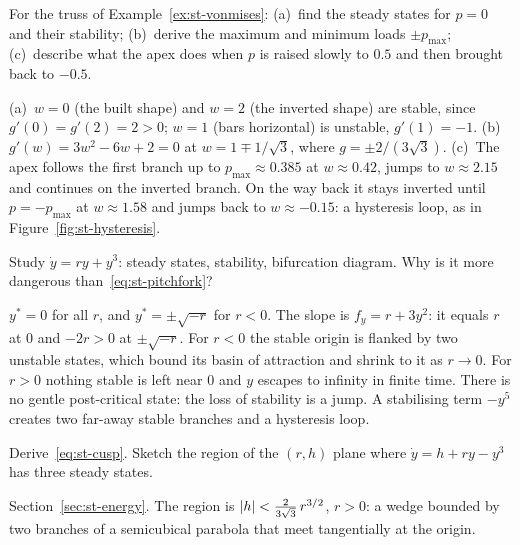 \label{exo:st-vonmises}
%
For the truss of Example~\ref{ex:st-vonmises}:
(a)~find the steady states for $p = 0$ and their stability;
(b)~derive the maximum and minimum loads $\pm p_{\max}$;
(c)~describe what the apex does when $p$ is raised slowly to $0.5$ and then
brought back to $-0.5$.
\begin{solution}
(a)~$w = 0$ (the built shape) and $w = 2$ (the inverted shape) are stable,
since $g'(0) = g'(2) = 2 > 0$; $w = 1$ (bars horizontal) is unstable, $g'(1) = -1$.
(b)~$g'(w) = 3w^2 - 6w + 2 = 0$ at $w = 1 \mp 1/\sqrt3$, where
$g = \pm 2/(3\sqrt3)$.
(c)~The apex follows the first branch up to $p_{\max} \approx 0.385$ at
$w \approx 0.42$, jumps to $w \approx 2.15$ and continues on the inverted branch.
On the way back it stays inverted until $p = -p_{\max}$ at $w \approx 1.58$ and
jumps back to $w \approx -0.15$: a hysteresis loop, as in
Figure~\ref{fig:st-hysteresis}.
\end{solution}

\label{exo:st-subcritical}
%
Study $\dot y = ry + y^3$: steady states, stability, bifurcation diagram. Why is
it more dangerous than~\eqref{eq:st-pitchfork}?
\begin{solution}
$y^* = 0$ for all $r$, and $y^* = \pm\sqrt{-r}$ for $r < 0$. The slope is
$f_y = r + 3y^2$: it equals $r$ at $0$ and $-2r > 0$ at $\pm\sqrt{-r}$. For $r < 0$
the stable origin is flanked by two unstable states, which bound its basin of
attraction and shrink to it as $r \to 0$. For $r > 0$ nothing stable is left near
$0$ and $y$ escapes to infinity in finite time. There is no gentle post-critical
state: the loss of stability is a jump. A stabilising term $-y^5$ creates two
far-away stable branches and a hysteresis loop.
\end{solution}

\label{exo:st-cusp}
%
Derive~\eqref{eq:st-cusp}. Sketch the region of the $(r,h)$ plane where
$\dot y = h + ry - y^3$ has three steady states.
\begin{solution}
Section~\ref{sec:st-energy}. The region is
$\lvert h\rvert < \tfrac{2}{3\sqrt3}\,r^{3/2}$, $r > 0$: a wedge bounded by two branches
of a semicubical parabola that meet tangentially at the origin.
\end{solution}

